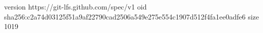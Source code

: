 version https://git-lfs.github.com/spec/v1
oid sha256:c2a74d03125f51a9af22790cad2506a549e275e554c1907d512f4fa1ee0adfe6
size 1019
